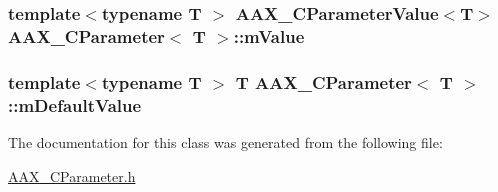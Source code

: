 \subsubsection[{m\+Value}]{\setlength{\rightskip}{0pt plus 5cm}template$<$typename T $>$ {\bf A\+A\+X\+\_\+\+C\+Parameter\+Value}$<$T$>$ {\bf A\+A\+X\+\_\+\+C\+Parameter}$<$ T $>$\+::m\+Value\hspace{0.3cm}{\ttfamily [protected]}}\label{a00033_a039040b844bda418b110f38016757dd3}
\hypertarget{a00033_a1ecf6a063aa9c4335470cad963125ebb}{}
\subsubsection[{m\+Default\+Value}]{\setlength{\rightskip}{0pt plus 5cm}template$<$typename T $>$ T {\bf A\+A\+X\+\_\+\+C\+Parameter}$<$ T $>$\+::m\+Default\+Value\hspace{0.3cm}{\ttfamily [protected]}}\label{a00033_a1ecf6a063aa9c4335470cad963125ebb}


The documentation for this class was generated from the following file\+:\begin{DoxyCompactItemize}
\item 
\hyperlink{a00190}{A\+A\+X\+\_\+\+C\+Parameter.\+h}\end{DoxyCompactItemize}
